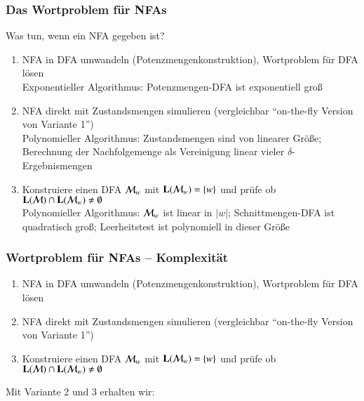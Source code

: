 \documentclass[onlymath]{beamer}
\begin{document}
\begin{frame}\frametitle{Das Wortproblem für NFAs}

Was tun, wenn ein NFA gegeben ist?
\begin{enumerate}[{Variante} 1:]
\item \alert{NFA in DFA umwandeln (Potenzmengenkonstruktion), Wortproblem für DFA lösen}\\
	Exponentieller Algorithmus: Potenzmengen-DFA ist exponentiell groß
\item \alert{NFA direkt mit Zustandsmengen simulieren (vergleichbar "`on-the-fly Version von Variante 1"')}\\
	Polynomieller Algorithmus: Zustandsmengen sind von linearer Größe; Berechnung der Nachfolgemenge als
	Vereinigung linear vieler $\delta$-Ergebnismengen
\item \alert{Konstruiere einen DFA $\mathcal{M}_w$ mit $\textbf{\textcolor{black}{L}}(\mathcal{M}_w)=\{w\}$ und prüfe ob
$\textbf{\textcolor{black}{L}}(\mathcal{M})\cap \textbf{\textcolor{black}{L}}(\mathcal{M}_w) \neq\emptyset$}\\
	Polynomieller Algorithmus: $\mathcal{M}_w$ ist linear in $|w|$; Schnittmengen-DFA ist quadratisch groß;
	Leerheitstest ist polynomiell in dieser Größe
\end{enumerate}

\end{frame}

\begin{frame}[t]\frametitle{Wortproblem für NFAs -- Komplexität}

\begin{enumerate}[{Variante} 1:]
\item \alert{NFA in DFA umwandeln (Potenzmengenkonstruktion), Wortproblem für DFA lösen}
\item \alert{NFA direkt mit Zustandsmengen simulieren (vergleichbar "`on-the-fly Version von Variante 1"')}
\item \alert{Konstruiere einen DFA $\mathcal{M}_w$ mit $\textbf{\textcolor{black}{L}}(\mathcal{M}_w)=\{w\}$ und prüfe ob
$\textbf{\textcolor{black}{L}}(\mathcal{M})\cap \textbf{\textcolor{black}{L}}(\mathcal{M}_w) \neq\emptyset$}
\end{enumerate}

Mit Variante 2 und 3 erhalten wir:\medskip


\end{frame}
\end{document}
